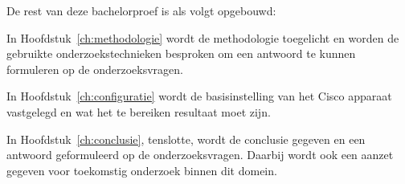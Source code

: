 
De rest van deze bachelorproef is als volgt opgebouwd:

In Hoofdstuk~\ref{ch:methodologie} wordt de methodologie toegelicht en worden de gebruikte onderzoekstechnieken besproken om een antwoord te kunnen formuleren op de onderzoeksvragen.

In Hoofdstuk~\ref{ch:configuratie} wordt de basisinstelling van het Cisco apparaat vastgelegd en wat het te bereiken resultaat moet zijn. 

In Hoofdstuk~\ref{ch:conclusie}, tenslotte, wordt de conclusie gegeven en een antwoord geformuleerd op de onderzoeksvragen. Daarbij wordt ook een aanzet gegeven voor toekomstig onderzoek binnen dit domein.


